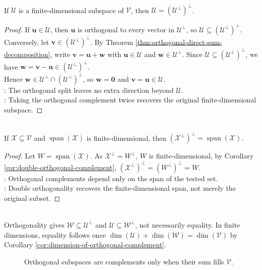 \begin{corollary} \label{cor:double-orthogonal-complement} \\
If $\mathcal{U}$ is a finite-dimensional subspace of $\mathcal{V}$, then $\mathcal{U}=(\mathcal{U}^{\perp})^{\perp}$.
\begin{proof}
If $\mathbf{u}\in\mathcal{U}$, then $\mathbf{u}$ is orthogonal to every vector in $\mathcal{U}^{\perp}$, so $\mathcal{U}\subseteq(\mathcal{U}^{\perp})^{\perp}$. Conversely, let $\mathbf{v}\in(\mathcal{U}^{\perp})^{\perp}$. By Theorem \ref{thm:orthogonal-direct-sum-decomposition}, write $\mathbf{v}=\mathbf{u}+\mathbf{w}$ with $\mathbf{u}\in\mathcal{U}$ and $\mathbf{w}\in\mathcal{U}^{\perp}$. Since $\mathcal{U}\subseteq(\mathcal{U}^{\perp})^{\perp}$, we have $\mathbf{w}=\mathbf{v}-\mathbf{u}\in(\mathcal{U}^{\perp})^{\perp}$.\\
Hence $\mathbf{w}\in\mathcal{U}^{\perp}\cap(\mathcal{U}^{\perp})^{\perp}$, so $\mathbf{w}=\mathbf{0}$ and $\mathbf{v}=\mathbf{u}\in\mathcal{U}$.\\
: The orthogonal split leaves no extra direction beyond $\mathcal{U}$.\\
: Taking the orthogonal complement twice recovers the original finite-dimensional subspace.
\end{proof}
\end{corollary}

\begin{corollary} \label{cor:double-orthogonal-complement-of-finite-span} \\
If $\mathcal{X}\subseteq\mathcal{V}$ and $\operatorname{span}(\mathcal{X})$ is finite-dimensional, then $(\mathcal{X}^{\perp})^{\perp}=\operatorname{span}(\mathcal{X})$.
\begin{proof}
Let $W=\operatorname{span}(\mathcal{X})$. As $\mathcal{X}^{\perp}=W^{\perp}$, $W$ is finite-dimensional, by Corollary \ref{cor:double-orthogonal-complement}, $(\mathcal{X}^{\perp})^{\perp}=(W^{\perp})^{\perp}=W$.\\
: Orthogonal complements depend only on the span of the tested set.\\
: Double orthogonality recovers the finite-dimensional span, not merely the original subset.
\end{proof}
\end{corollary}

\begin{perspective} \label{per:orthogonal-subspaces-versus-complements} \\
Orthogonality gives $\mathcal{W}\subseteq\mathcal{U}^{\perp}$ and $\mathcal{U}\subseteq\mathcal{W}^{\perp}$, not necessarily equality. In finite dimensions, equality follows once $\dim(\mathcal{U})+\dim(\mathcal{W})=\dim(\mathcal{V})$ by Corollary \ref{cor:dimension-of-orthogonal-complement}.
\end{perspective}

\begin{figure}[H]
  \centering
  
  \caption{Orthogonal subspaces are complements only when their sum fills $\mathcal{V}$.}
  \label{fig:orthogonal-subspaces-vs-complements}
\end{figure}

